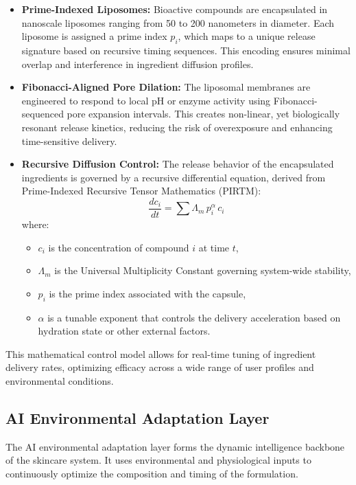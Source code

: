 \documentclass{article}
\theoremstyle{plain}
\theoremstyle{claimstyle}
\begin{document}
\begin{itemize}
    \item \textbf{Prime-Indexed Liposomes:} Bioactive compounds are encapsulated in nanoscale liposomes ranging from 50 to 200 nanometers in diameter. Each liposome is assigned a prime index \( p_i \), which maps to a unique release signature based on recursive timing sequences. This encoding ensures minimal overlap and interference in ingredient diffusion profiles.

    \item \textbf{Fibonacci-Aligned Pore Dilation:} The liposomal membranes are engineered to respond to local pH or enzyme activity using Fibonacci-sequenced pore expansion intervals. This creates non-linear, yet biologically resonant release kinetics, reducing the risk of overexposure and enhancing time-sensitive delivery.

    \item \textbf{Recursive Diffusion Control:} The release behavior of the encapsulated ingredients is governed by a recursive differential equation, derived from Prime-Indexed Recursive Tensor Mathematics (PIRTM):
    \[
    \frac{dc_i}{dt} = \sum \Lambda_m \, p_i^\alpha \, c_i
    \]
    where:
    \begin{itemize}
        \item \( c_i \) is the concentration of compound \( i \) at time \( t \),
        \item \( \Lambda_m \) is the Universal Multiplicity Constant governing system-wide stability,
        \item \( p_i \) is the prime index associated with the capsule,
        \item \( \alpha \) is a tunable exponent that controls the delivery acceleration based on hydration state or other external factors.
    \end{itemize}
\end{itemize}

This mathematical control model allows for real-time tuning of ingredient delivery rates, optimizing efficacy across a wide range of user profiles and environmental conditions.

\vspace{1em}

\subsection{AI Environmental Adaptation Layer}

The AI environmental adaptation layer forms the dynamic intelligence backbone of the skincare system. It uses environmental and physiological inputs to continuously optimize the composition and timing of the formulation.
\end{document}
